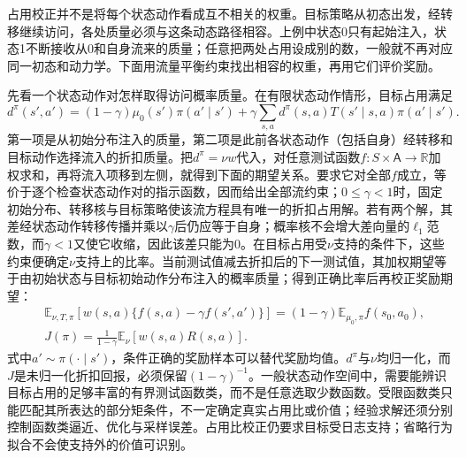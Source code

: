 占用校正并不是将每个状态动作看成互不相关的权重。目标策略从初态出发，经转移继续访问，各处质量必须与这条动态路径相容。上例中状态0只有起始注入，状态1不断接收从0和自身流来的质量；任意把两处占用设成别的数，一般就不再对应同一初态和动力学。下面用流量平衡约束找出相容的权重，再用它们评价奖励。

先看一个状态动作对怎样取得访问概率质量。在有限状态动作情形，目标占用满足
\[
  d^\pi(s',a')=(1-\gamma)\mu_0(s')\pi(a'\mid s')
    +\gamma\sum_{s,a}d^\pi(s,a)T(s'\mid s,a)\pi(a'\mid s').
\]
第一项是从初始分布注入的质量，第二项是此前各状态动作（包括自身）经转移和目标动作选择流入的折扣质量。把$d^\pi=\nu w$代入，对任意测试函数$f:S\times\mathsf A\to\mathbb R$加权求和，再将流入项移到左侧，就得到下面的期望关系。要求它对全部$f$成立，等价于逐个检查状态动作对的指示函数，因而给出全部流约束；$0\leq\gamma<1$时，固定初始分布、转移核与目标策略使该流方程具有唯一的折扣占用解。若有两个解，其差经状态动作转移传播并乘以$\gamma$后仍应等于自身；概率核不会增大差向量的$\ell_1$范数，而$\gamma<1$又使它收缩，因此该差只能为0。在目标占用受$\nu$支持的条件下，这些约束便确定$\nu$支持上的比率。当前测试值减去折扣后的下一测试值，其加权期望等于由初始状态与目标初始动作分布注入的概率质量；得到正确比率后再校正奖励期望：
\begin{align}
  \label{eq:rl-information-dice}
  &\mathbb E_{\nu,T,\pi}\!
       \left[w(s,a)\{f(s,a)-\gamma f(s',a')\}\right]
       =(1-\gamma)\mathbb E_{\mu_0,\pi}f(s_0,a_0),\nonumber\\
  &J(\pi)=\frac{1}{1-\gamma}\mathbb E_\nu[w(s,a)R(s,a)].
\end{align}
式中$a'\sim\pi(\cdot\mid s')$，条件正确的奖励样本可以替代奖励均值。$d^\pi$与$\nu$均归一化，而$J$是未归一化折扣回报，必须保留$(1-\gamma)^{-1}$。一般状态动作空间中，需要能辨识目标占用的足够丰富的有界测试函数类，而不是任意选取少数函数。受限函数类只能匹配其所表达的部分矩条件，不一定确定真实占用比或价值；经验求解还须分别控制函数类逼近、优化与采样误差。占用比校正仍要求目标受日志支持；省略行为拟合不会使支持外的价值可识别。

